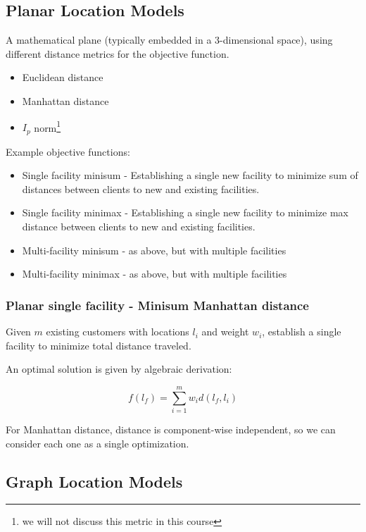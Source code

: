 \documentclass{idc_msc}
\begin{document}
\subsection{Planar Location Models}

A mathematical plane (typically embedded in a 3-dimensional space), using different distance metrics for the objective function.

\begin{itemize}
  \item Euclidean distance
  \item Manhattan distance
  \item \(I_p\) norm\footnote{we will not discuss this metric in this course}
\end{itemize}

Example objective functions:

\begin{itemize}
  \item Single facility minisum - Establishing a single new facility to minimize sum of distances between clients to new and existing facilities.
  \item Single facility minimax - Establishing a single new facility to minimize max distance between clients to new and existing facilities.
  \item Multi-facility minisum - as above, but with multiple facilities
  \item Multi-facility minimax - as above, but with multiple facilities
\end{itemize}

\subsubsection{Planar single facility - Minisum Manhattan distance}

Given \(m\) existing customers with locations \(l_i\) and weight \(w_i\), establish a single facility to minimize total distance traveled.

An optimal solution is given by algebraic derivation:

\[f(l_f) = \sum_{i=1}^m w_i d(l_f, l_i)\]

For Manhattan distance, distance is component-wise independent, so we can consider each one as a single optimization.

\subsection{Graph Location Models}
\end{document}
